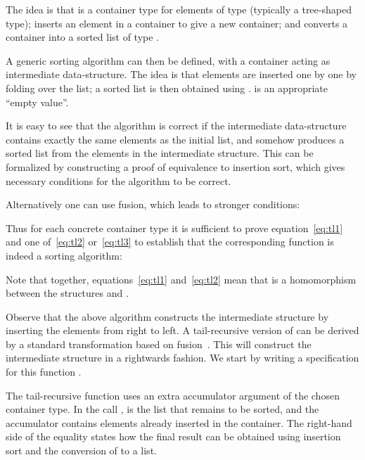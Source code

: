\documentclass[a4paper,11pt]{llncs}
\begin{document}
The idea is that  is a container type for elements of type
 (typically a tree-shaped type);
 inserts an element in a container to give a new container;
and  converts a container into a sorted list of type
. 

A generic sorting algorithm can then be defined, with a container
acting as intermediate data-structure. The idea is that elements are
inserted one by one by folding over the list; a sorted list is then
obtained using .  is an
appropriate ``empty value''.

It is easy to see that the algorithm is correct if the intermediate
data-structure contains exactly the same elements as the initial list,
and  somehow produces a sorted list from the elements in
the intermediate structure. This can be formalized by constructing a
proof of equivalence to insertion sort, which gives necessary
conditions for the algorithm to be correct.



Alternatively one can use fusion, which leads to stronger conditions:



Thus for each concrete container type it is sufficient to prove
equation~\ref{eq:tl1} and one of~\ref{eq:tl2} or~\ref{eq:tl3} to
establish that the corresponding function  is indeed a
sorting algorithm:

Note that together, equations~\ref{eq:tl1} and~\ref{eq:tl2} mean that
 is a homomorphism between the structures  and .















Observe that the above algorithm constructs the intermediate structure
by inserting the elements from right to left.  
A tail-recursive version of  can be derived by a standard
transformation based on fusion~\cite{BirdR:proastp}. This will
construct the intermediate structure in a rightwards fashion.
We start by writing a specification for this function .


The tail-recursive function uses an extra accumulator argument of the
chosen container type. In the call ,  is the
list that remains to be sorted, and the accumulator  contains
elements already inserted in the container. The right-hand side of the
equality states how the final result can be obtained using insertion
sort and the conversion of  to a list. 
\end{document}
